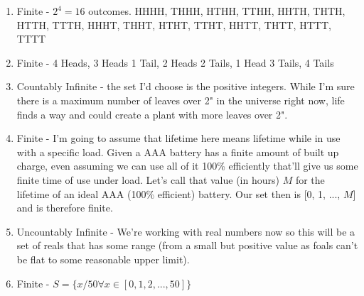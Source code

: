 \documentclass[11pt]{article}
\begin{document}
\begin{enumerate}[label=\alph*]
\item Finite - $2^4=16$ outcomes. HHHH, THHH, HTHH, TTHH, HHTH, THTH, HTTH, TTTH, HHHT, THHT, HTHT, TTHT, HHTT, THTT, HTTT, TTTT
\item Finite - 4 Heads, 3 Heads 1 Tail, 2 Heads 2 Tails, 1 Head 3 Tails, 4 Tails
\item Countably Infinite - the set I'd choose is the positive integers. While I'm sure there is a maximum number of leaves over 2" in the universe right now, life finds a way and could create a plant with more leaves over 2". 
\item Finite - I'm going to assume that lifetime here means lifetime while in use with a specific load. Given a AAA battery has a finite amount of built up charge, even assuming we can use all of it 100\% efficiently that'll give us some finite time of use under load. Let's call that value (in hours) $M$ for the lifetime of an ideal AAA (100\% efficient) battery. Our set then is [0, 1, ..., $M$] and is therefore finite. 
\item Uncountably Infinite - We're working with real numbers now so this will be a set of reals that has some range (from a small but positive value as foals can't be flat to some reasonable upper limit).
\item Finite - $S=\{ x/50 \forall x \in [0, 1, 2, ..., 50] \}$
\end{enumerate}
\end{document}
